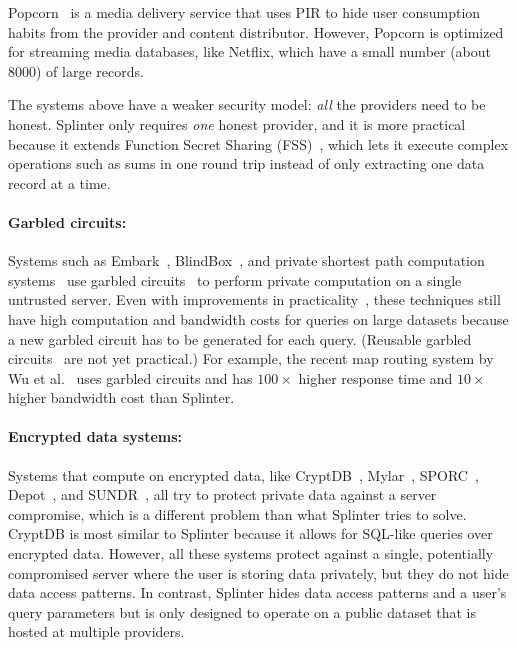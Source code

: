 Popcorn~\cite{popcorn} is a media delivery service that 
uses PIR to hide user consumption habits from the provider
and content distributor. However, Popcorn is optimized for
streaming media databases, like Netflix, which have a small number (about 8000)
of large records. 

The systems above have a weaker
security model: \textit{all} the providers need to be honest.
Splinter only requires \textit{one} honest provider, and
it is more practical because it 
extends Function Secret Sharing (FSS)~\cite{fss,gilboa2014distributed}, which lets
it execute complex operations such as sums in one round trip
instead of only extracting one data record at a time.

\paragraph{Garbled circuits:}
Systems such as Embark~\cite{lan2016embark}, BlindBox~\cite{blindbox}, 
and private shortest path computation systems~\cite{wu2016}
use garbled circuits~\cite{Yao, goldwasser1997multi} to perform private computation
on a single untrusted server.
Even with improvements in practicality~\cite{bellare2013efficient}, these
techniques still have high computation and bandwidth costs for queries on
large datasets because a new garbled circuit has to be generated for each query.
(Reusable garbled circuits~\cite{goldwasser:sfe} are not yet practical.)
For example, the recent map routing system by Wu et al.~\cite{wu2016} uses garbled circuits and 
has $100\times$ higher response time and $10\times$ higher bandwidth cost
than Splinter.

\paragraph{Encrypted data systems:}
Systems that compute on encrypted data, like 
CryptDB~\cite{popa:cryptdb}, Mylar~\cite{popa:mylar}, SPORC~\cite{feldman:sporc},
Depot~\cite{mahajan:depot}, and SUNDR~\cite{li:sundr}, all try to protect
private data against a server compromise, which is a different
problem than what Splinter tries to solve. CryptDB is most similar to Splinter 
because it allows for SQL-like queries over encrypted data. However, all
these systems protect against a single, potentially compromised server 
where the user is storing data privately, but they do not hide data access patterns. 
In contrast, Splinter hides data access patterns and a user's query parameters 
but is only designed to operate on a 
public dataset that is hosted at multiple providers.


